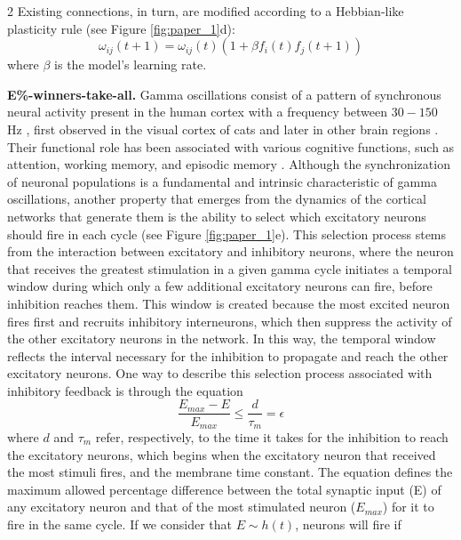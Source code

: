 \documentclass[a4paper, 10pt]{article}
\begin{document}
\begin{multicols}{2}
Existing connections, in turn, are modified according to a Hebbian-like plasticity rule (see Figure \ref{fig:paper_1}d): 
\begin{equation}\label{eq:heb}
\omega_{ij}(t+1) = \omega_{ij}(t)(1+\beta f_{i}(t)f_{j}(t+1))
\end{equation}
where $\beta$ is the model's learning rate.
\newline

\noindent\textbf{E\%-winners-take-all.} Gamma oscillations consist of a pattern of synchronous neural activity present in the human cortex with a frequency between $30-150$ Hz \cite{buz_2,health}, first observed in the visual cortex of cats \cite{gray} and later in other brain regions \cite{Fries2007-cx}. Their functional role has been associated with various cognitive functions, such as attention, working memory, and episodic memory \cite{Fries2001-rp, Jensen2007-hy, gama_working, Grif}. Although the synchronization of neuronal populations is a fundamental and intrinsic characteristic of gamma oscillations, another property that emerges from the dynamics of the cortical networks that generate them is the ability to select which excitatory neurons should fire in each cycle \cite{Fries2007-cx} (see Figure \ref{fig:paper_1}e). This selection process stems from the interaction between excitatory and inhibitory neurons, where the neuron that receives the greatest stimulation in a given gamma cycle initiates a temporal window during which only a few additional excitatory neurons can fire, before inhibition reaches them. This window is created because the most excited neuron fires first and recruits inhibitory interneurons, which then suppress the activity of the other excitatory neurons in the network. In this way, the temporal window reflects the interval necessary for the inhibition to propagate and reach the other excitatory neurons. One way to describe this selection process associated with inhibitory feedback is through the equation \cite{licurgo}
\begin{equation}
    \frac{E_{max} - E}{E_{max}} \leq \frac{d}{\tau_m} = \epsilon
    \label{emax}
\end{equation}
where $d$ and $\tau_m$ refer, respectively, to the time it takes for the inhibition to reach the excitatory neurons, which begins when the excitatory neuron that received the most stimuli fires, and the membrane time constant.  The equation defines the maximum allowed percentage difference between the total synaptic input (E) of any excitatory neuron and that of the most stimulated neuron ($E_{max}$) for it to fire in the same cycle. If we consider that $E \sim h(t)$, neurons will fire if

\end{multicols}
\end{document}
